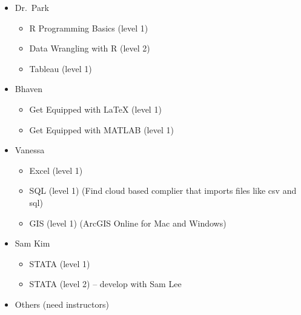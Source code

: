 \documentclass[
]{book}
\providecommand{\tightlist}{%
  \setlength{\itemsep}{0pt}\setlength{\parskip}{0pt}}
\begin{document}
\begin{itemize}
\tightlist
\item
  Dr.~Park

  \begin{itemize}
  \tightlist
  \item
    R Programming Basics (level 1)\\
  \item
    Data Wrangling with R (level 2)
  \item
    Tableau (level 1)\\
  \end{itemize}
\item
  Bhaven

  \begin{itemize}
  \tightlist
  \item
    Get Equipped with LaTeX (level 1)\\
  \item
    Get Equipped with MATLAB (level 1)\\
  \end{itemize}
\item
  Vanessa

  \begin{itemize}
  \tightlist
  \item
    Excel (level 1)\\
  \item
    SQL (level 1) (Find cloud based complier that imports files like csv and sql)
  \item
    GIS (level 1) (ArcGIS Online for Mac and Windows)
  \end{itemize}
\item
  Sam Kim

  \begin{itemize}
  \tightlist
  \item
    STATA (level 1)
  \item
    STATA (level 2) -- develop with Sam Lee
  \end{itemize}
\item
  Others (need instructors)


\end{itemize}
\end{document}
